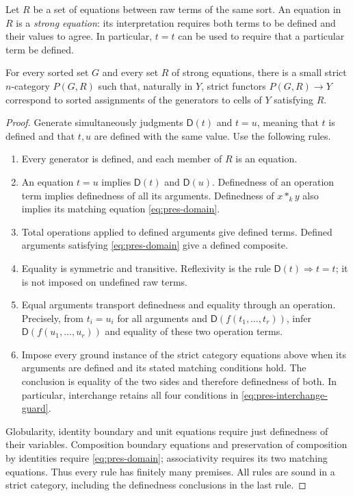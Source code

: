 Let $R$ be a set of equations between raw terms of the same sort.
An equation in $R$ is a \emph{strong equation}: its interpretation
requires both terms to be defined and their values to agree. In
particular, $t=t$ can be used to require that a particular term be
defined.

\begin{lemma}
\label{lem:strict-presentations}
For every sorted set $G$ and every set $R$ of strong equations,
there is a small strict $n$-category $P(G,R)$ such that, naturally in
$Y$, strict functors $P(G,R)\to Y$ correspond to sorted assignments
of the generators to cells of $Y$ satisfying $R$.
\end{lemma}

\begin{proof}
Generate simultaneously judgments $\mathsf D(t)$ and $t=u$,
meaning that $t$ is defined and that $t,u$ are defined with the
same value. Use the following rules.
\begin{enumerate}[label=(\roman*)]
\item Every generator is defined, and each member of $R$ is an
equation.
\item An equation $t=u$ implies $\mathsf D(t)$ and $\mathsf D(u)$.
Definedness of an operation term implies definedness of all its
arguments. Definedness of $x*_k y$ also implies its matching
equation \eqref{eq:pres-domain}.
\item Total operations applied to defined arguments give defined
terms. Defined arguments satisfying \eqref{eq:pres-domain} give a
defined composite.
\item Equality is symmetric and transitive. Reflexivity is the
rule $\mathsf D(t)\Rightarrow t=t$; it is not imposed on undefined
raw terms.
\item Equal arguments transport definedness and equality through
an operation. Precisely, from $t_i=u_i$ for all arguments and
$\mathsf D(f(t_1,\ldots,t_r))$, infer
$\mathsf D(f(u_1,\ldots,u_r))$ and equality of these two operation
terms.
\item Impose every ground instance of the strict category equations
above when its arguments are defined and its stated matching
conditions hold. The conclusion is equality of the two sides and
therefore definedness of both. In particular, interchange retains
all four conditions in \eqref{eq:pres-interchange-guard}.
\end{enumerate}
Globularity, identity boundary and unit equations require just
definedness of their variables. Composition boundary equations and
preservation of composition by identities require
\eqref{eq:pres-domain}; associativity requires its two matching
equations. Thus every rule has finitely many premises. All rules
are sound in a strict category, including the definedness conclusions
in the last rule.


\end{proof}
